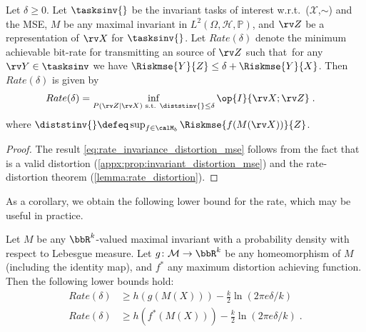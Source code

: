 \documentclass[final]{article}
\begin{document}
\begin{theorem}\label{thm:rate_invariance_distortion_mse}
Let $\delta \geq 0$.
Let $\tasksinv{}$ be the invariant tasks of interest w.r.t.\ ($\mathcal{X}$,$\sim$) and the MSE, $M$ be any maximal invariant in $L^2(\Omega,\mathcal{H},\mathbb{P})$, and $\rv Z$ be a representation of $\rv X$ for $\tasksinv{}$.
Let $Rate(\delta)$ denote the minimum achievable bit-rate for transmitting an \iid source of $\rv Z$ such that\ for any $\rv Y \in \tasksinv$ we have $\Riskmse{Y}{Z} \leq \delta + \Riskmse{Y}{X}$.
Then $Rate(\delta)$  is given by
\begin{align}
Rate(\delta) & = 
\inf_{P(\rv Z | \rv X) \text{ s.t. } \diststinv{} \leq \delta }   \op{I}{\rv X; \rv Z} \label{eq:rate_invariance_distortion_mse} \;.
\end{align}
where $\diststinv{} \defeq \sup_{f \in \calM_b} \Riskmse{f(M(\rv X))}{Z}$.
\end{theorem}
\begin{proof}
The result \eqref{eq:rate_invariance_distortion_mse} follows from the fact that \disttextinv{} is a valid distortion (\cref{appx:prop:invariant_distortion_mse}) and the rate-distortion theorem (\ref{lemma:rate_distortion}). 
\end{proof}
As a corollary, we obtain the following lower bound for the rate, which may be useful in practice.
\begin{corollary}
	Let $M$ be any $\bbR^k$-valued maximal invariant with a probability density with respect to Lebesgue measure. Let $g \colon \mathcal{M} \to \bbR^k$ be any homeomorphism of $M$ (including the identity map), and $f^*$ any maximum distortion achieving function. Then the following lower bounds hold:
	\begin{align} \label{eq:mse:rate:lower:bounds}
	 Rate(\delta) & \geq  h(g(M(X))) - \frac{k}{2}\ln(2\pi e \delta/k) \\
	 Rate(\delta)	&  \geq h(f^*(M(X))) - \frac{k}{2}\ln(2\pi e \delta/k) \;.
	\end{align} 
\end{corollary}
\end{document}
